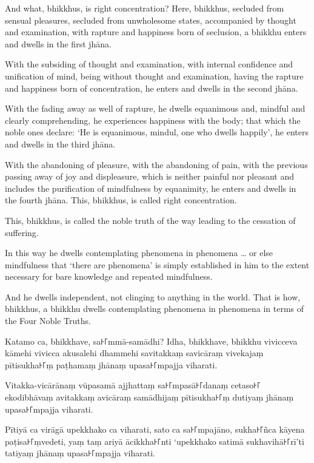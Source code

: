 And what, bhikkhus, is right concentration? Here, bhikkhus, secluded from
sensual pleasures, secluded from unwholesome states, accompanied by thought and
examination, with rapture and happiness born of seclusion, a bhikkhu enters and
dwells in the first jhāna.

With the subsiding of thought and examination, with internal confidence and
unification of mind, being without thought and examination, having the rapture
and happiness born of concentration, he enters and dwells in the second jhāna.

With the fading away as well of rapture, he dwells equanimous and, mindful and
clearly comprehending, he experiences happiness with the body; that which the
noble ones declare: `He is equanimous, mindul, one who dwells happily', he
enters and dwells in the third jhāna.

With the abandoning of pleasure, with the abandoning of pain, with the previous
passing away of joy and displeasure, which is neither painful nor pleasant and
includes the purification of mindfulness by equanimity, he enters and dwells in
the fourth jhāna. This, bhikkhus, is called right concentration.

This, bhikkhus, is called the noble truth of the way leading to the cessation of
suffering.

In this way he dwells contemplating phenomena in phenomena \ldots{} or else
mindfulness that ‘there are phenomena’ is simply established in him to the
extent necessary for bare knowledge and repeated mindfulness.

And he dwells independent, not clinging to anything in the world. That is how,
bhikkhus, a bhikkhu dwells contemplating phenomena in phenomena in terms of the
Four Noble Truths.



\paliPage

Katamo ca, bhikkhave, sa꜔꜒mmā-samādhi? Idha, bhikkhave, bhikkhu vivicceva kāmehi
vivicca akusalehi dhammehi savitakkaṃ savicāraṃ vivekajaṃ pītisukha꜔꜒ṃ paṭhamaṃ
jhānaṃ upasa꜔꜒mpajja viharati.

Vitakka-vicārānaṃ vūpasamā ajjhattaṃ sa꜔꜒mpasā꜔꜒danaṃ cetaso꜔꜒ ekodibhāvaṃ avitakkaṃ
avicāraṃ samādhijaṃ pītisukha꜔꜒ṃ dutiyaṃ jhānaṃ upasa꜔꜒mpajja viharati.

Pītiyā ca virāgā upekkhako ca viharati, sato ca sa꜔꜒mpajāno, sukha꜔꜒ñca kāyena
paṭisa꜔꜒ṃvedeti, yaṃ taṃ ariyā ācikkha꜔꜒nti ‘upekkhako satimā sukhavihā꜔꜒rī’ti tatiyaṃ
jhānaṃ upasa꜔꜒mpajja viharati.

